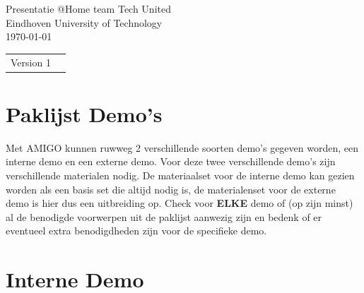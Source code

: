 \documentclass[a4paper,10pt]{article}
\numberwithin{equation}{section}
\numberwithin{figure}{section}
\numberwithin{table}{section}
\begin{document}
	\begin{titlepage}
		
		\begin{center}
			\vspace{15mm}
		\end{center}
		
		\begin{figure}[H]
			\centering
		\end{figure}
		
		\begin{center}
			\vspace{10mm}
			{\Huge Presentatie @Home team Tech United}\\
			\vspace{3mm}
			{\Large Eindhoven University of Technology}\\
			\vspace{10mm}
			\vspace{3mm}
			\today
		\end{center}
		
		\vfill
		
		
		\begin{tabular}{l l}
			Version 1\\
		\end{tabular}
		
	\end{titlepage}

\section*{Paklijst Demo's}
Met AMIGO kunnen ruwweg 2 verschillende soorten demo's gegeven worden, een interne demo en een externe demo. Voor deze twee verschillende demo's zijn verschillende materialen nodig. De materiaalset voor de interne demo kan gezien worden als een basis set die altijd nodig is, de materialenset voor de externe demo is hier dus een uitbreiding op. Check voor \textbf{ELKE} demo of (op zijn minst) al de benodigde voorwerpen uit de paklijst aanwezig zijn en bedenk of er eventueel extra benodigdheden zijn voor de specifieke demo.

\section{Interne Demo}
\end{document}
